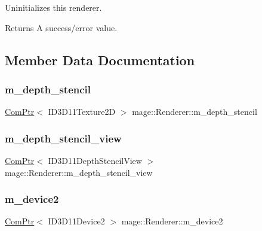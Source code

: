 Uninitializes this renderer.

\begin{DoxyReturn}{Returns}
A success/error value. 
\end{DoxyReturn}


\subsection{Member Data Documentation}
\hypertarget{classmage_1_1_renderer_a9f7f61e09d9c788ab4d3190bc0fa58d8}{}\label{classmage_1_1_renderer_a9f7f61e09d9c788ab4d3190bc0fa58d8} 
\subsubsection{\texorpdfstring{m\+\_\+depth\+\_\+stencil}{m\_depth\_stencil}}
{\footnotesize\ttfamily \hyperlink{namespacemage_ae74f374780900893caa5555d1031fd79}{Com\+Ptr}$<$ I\+D3\+D11\+Texture2D $>$ mage\+::\+Renderer\+::m\+\_\+depth\+\_\+stencil\hspace{0.3cm}{\ttfamily [private]}}

\hypertarget{classmage_1_1_renderer_aaeefc175b9a619f95229a3f8464a7924}{}\label{classmage_1_1_renderer_aaeefc175b9a619f95229a3f8464a7924} 
\subsubsection{\texorpdfstring{m\+\_\+depth\+\_\+stencil\+\_\+view}{m\_depth\_stencil\_view}}
{\footnotesize\ttfamily \hyperlink{namespacemage_ae74f374780900893caa5555d1031fd79}{Com\+Ptr}$<$ I\+D3\+D11\+Depth\+Stencil\+View $>$ mage\+::\+Renderer\+::m\+\_\+depth\+\_\+stencil\+\_\+view\hspace{0.3cm}{\ttfamily [private]}}

\hypertarget{classmage_1_1_renderer_a6c9757faeb4de815f024dc8eac89960c}{}\label{classmage_1_1_renderer_a6c9757faeb4de815f024dc8eac89960c} 
\subsubsection{\texorpdfstring{m\+\_\+device2}{m\_device2}}
{\footnotesize\ttfamily \hyperlink{namespacemage_ae74f374780900893caa5555d1031fd79}{Com\+Ptr}$<$ I\+D3\+D11\+Device2 $>$ mage\+::\+Renderer\+::m\+\_\+device2\hspace{0.3cm}{\ttfamily [private]}}


